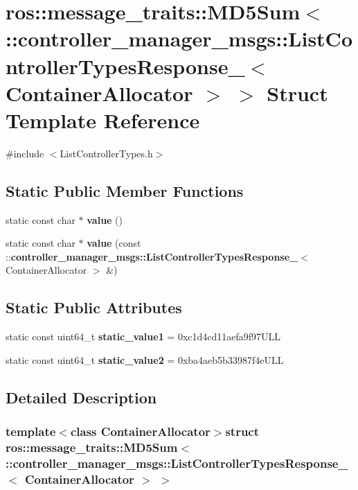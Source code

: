 \section{ros\-:\-:message\-\_\-traits\-:\-:\-M\-D5\-Sum$<$ \-:\-:controller\-\_\-manager\-\_\-msgs\-:\-:\-List\-Controller\-Types\-Response\-\_\-$<$ \-Container\-Allocator $>$ $>$ \-Struct \-Template \-Reference}
\label{structros_1_1message__traits_1_1MD5Sum_3_01_1_1controller__manager__msgs_1_1ListControllerTypesR163e08d053067865df54b11b7d08ce17}


{\ttfamily \#include $<$\-List\-Controller\-Types.\-h$>$}

\subsection*{\-Static \-Public \-Member \-Functions}
\begin{DoxyCompactItemize}
\item 
static const char $\ast$ {\bf value} ()
\item 
static const char $\ast$ {\bf value} (const \-::{\bf controller\-\_\-manager\-\_\-msgs\-::\-List\-Controller\-Types\-Response\-\_\-}$<$ \-Container\-Allocator $>$ \&)
\end{DoxyCompactItemize}
\subsection*{\-Static \-Public \-Attributes}
\begin{DoxyCompactItemize}
\item 
static const uint64\-\_\-t {\bf static\-\_\-value1} = 0xc1d4cd11aefa9f97\-U\-L\-L
\item 
static const uint64\-\_\-t {\bf static\-\_\-value2} = 0xba4aeb5b33987f4e\-U\-L\-L
\end{DoxyCompactItemize}


\subsection{\-Detailed \-Description}
\subsubsection*{template$<$class Container\-Allocator$>$struct ros\-::message\-\_\-traits\-::\-M\-D5\-Sum$<$ \-::controller\-\_\-manager\-\_\-msgs\-::\-List\-Controller\-Types\-Response\-\_\-$<$ Container\-Allocator $>$ $>$}



